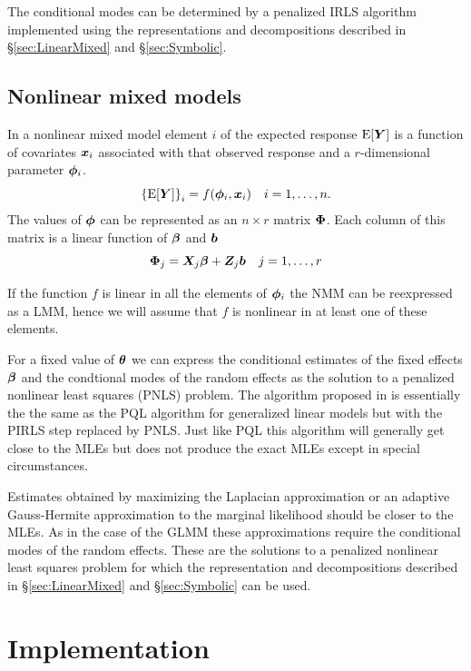 \documentclass[12pt]{article}
\begin{document}
The conditional modes can be determined by a penalized IRLS algorithm
implemented using the representations and decompositions described in
\S\ref{sec:LinearMixed} and \S\ref{sec:Symbolic}.


\subsection{Nonlinear mixed models}
\label{ssec:NMM}

In a nonlinear mixed model element $i$ of the expected response
$\mathrm{E}[\bm{Y}]$ is a function of covariates $\bm{x}_i$ associated with
that observed response and a $r$-dimensional parameter $\bm{\phi}_i$.
\begin{equation}
  \label{eq:NMM}
  \left\{\mathrm{E}[\bm{Y}]\right\}_i = f(\bm{\phi}_i, \bm{x}_i)\quad
  i=1,\dots,n .
\end{equation}
The values of $\bm{\phi}$ can be represented as an $n\times r$ matrix $\bm{\Phi}$.
Each column of this matrix is a linear function of $\bm{\beta}$ and $\bm{b}$
\begin{equation}
  \label{eq:NMMcomp}
  \bm{\Phi}_j=\bm{X}_j\bm{\beta}+\bm{Z}_j\bm{b}\quad j=1,\dots,r
\end{equation}

If the function $f$ is linear in all the elements of $\bm{\phi}_i$ the NMM
can be reexpressed as a LMM, hence we will assume that $f$ is
nonlinear in at least one of these elements.

For a fixed value of $\bm{\theta}$ we can express the conditional
estimates of the fixed effects $\bm{\beta}$ and the condtional modes of
the random effects as the solution to a penalized nonlinear least
squares (PNLS) problem.  The algorithm proposed in
\citet{lind:bate:1990} is essentially the the same as the PQL algorithm for generalized linear models but with the PIRLS
step replaced by PNLS.  Just like PQL this algorithm will generally
get close to the MLEs but does not produce the exact MLEs except in
special circumstances.  

Estimates obtained by maximizing the Laplacian approximation or an
adaptive Gauss-Hermite approximation to the marginal likelihood should
be closer to the MLEs.  As in the case of the GLMM these
approximations require the conditional modes of the random effects.
These are the solutions to a penalized nonlinear least squares problem
for which the representation and decompositions described in
\S\ref{sec:LinearMixed} and \S\ref{sec:Symbolic} can be used.

\section{Implementation}
\label{sec:Implementation}
\end{document}
